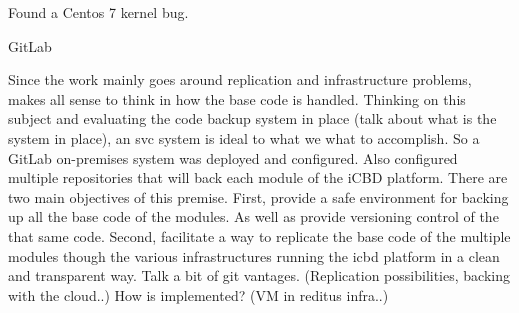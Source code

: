Found a Centos 7 kernel bug.


GitLab

Since the work mainly goes around replication and infrastructure problems, makes all sense to think in how the base code is handled. Thinking on this subject and evaluating the code backup system in place (talk about what is the system in place), an svc system is ideal to what we what to accomplish.
So a GitLab on-premises system was deployed and configured. Also configured multiple repositories that will back each module of the iCBD platform.
There are two main objectives of this premise.
First, provide a safe environment for backing up all the base code of the modules. As well as provide versioning control of the that same code.
Second, facilitate a way to replicate the base code of the multiple modules though the various infrastructures running the icbd platform in a clean and transparent way.
Talk a bit of git vantages. (Replication possibilities, backing with the cloud..)
How is implemented? (VM in reditus infra..)



